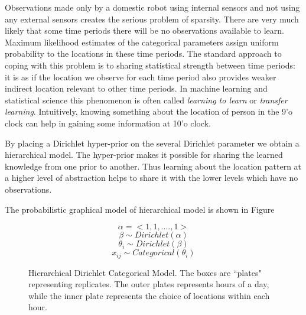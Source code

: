 Observations made only by a domestic robot using internal sensors and not using any external sensors creates the serious problem of sparsity. There are very much likely that some time periods there will be no observations available to learn. Maximum likelihood estimates of the categorical parameters assign uniform probability to the locations in these time periods. The standard approach to coping with this problem is to sharing statistical strength between time periods: it is as if the location we observe for each time period also provides weaker indirect location relevant to other time periods. In machine learning and statistical science this phenomenon is often called \emph{learning to learn} or \emph{transfer learning}. Intuitively, knowing something about the location of person in the 9'o clock can help in gaining some information at 10'o clock. 

By placing a Dirichlet hyper-prior on the several Dirichlet parameter we obtain a hierarchical model. The hyper-prior makes it possible for sharing the learned knowledge from one prior to another. Thus learning about the location pattern at a higher level of abstraction helps to share it with the lower levels which have no observations.

The probabilistic graphical model of  hierarchical model is shown in Figure \cite{hdcm}

\noindent
\begin{figure}[htp]

\begin{minipage}{0.3\textwidth}
\centering


\end{minipage}%
\begin{minipage}{0.7\textwidth}

\begin{equation*}
	\alpha = <1, 1, .... , 1 > 
\end{equation*}
\begin{equation*}
	\beta \sim Dirichlet(\alpha)
\end{equation*}
\begin{equation*}
	\theta_i  \sim Dirichlet(\beta)
\end{equation*}
\begin{equation*}
	x_{ij} \sim Categorical(\theta_i)
\end{equation*}
\end{minipage}
\caption[Hierarchical dirichlet categorical graphical model representation]{Hierarchical Dirichlet Categorical Model. The boxes are ``plates" representing replicates. The outer plates represents hours of a day, while the inner plate represents the choice of locations within each hour.}
\label{hdcm}
\end{figure}

